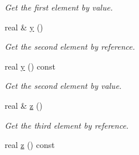 \begin{DoxyCompactItemize}
\begin{DoxyCompactList}\small\item\em Get the first element by value. \end{DoxyCompactList}\item 
real \& \hyperlink{class_point_abdedcae417002d4e747b876a346a5062}{y} ()\hypertarget{class_point_abdedcae417002d4e747b876a346a5062}{}\label{class_point_abdedcae417002d4e747b876a346a5062}

\begin{DoxyCompactList}\small\item\em Get the second element by reference. \end{DoxyCompactList}\item 
real \hyperlink{class_point_ad4dc38edfea288dbfed132cf5ce3830a}{y} () const \hypertarget{class_point_ad4dc38edfea288dbfed132cf5ce3830a}{}\label{class_point_ad4dc38edfea288dbfed132cf5ce3830a}

\begin{DoxyCompactList}\small\item\em Get the second element by value. \end{DoxyCompactList}\item 
real \& \hyperlink{class_point_a70f81bbcc60b59191dba261ec8bee87e}{z} ()\hypertarget{class_point_a70f81bbcc60b59191dba261ec8bee87e}{}\label{class_point_a70f81bbcc60b59191dba261ec8bee87e}

\begin{DoxyCompactList}\small\item\em Get the third element by reference. \end{DoxyCompactList}\item 
real \hyperlink{class_point_ae344dd16dddf7ae80f665f085874fd55}{z} () const \hypertarget{class_point_ae344dd16dddf7ae80f665f085874fd55}{}\label{class_point_ae344dd16dddf7ae80f665f085874fd55}


\end{DoxyCompactItemize}
